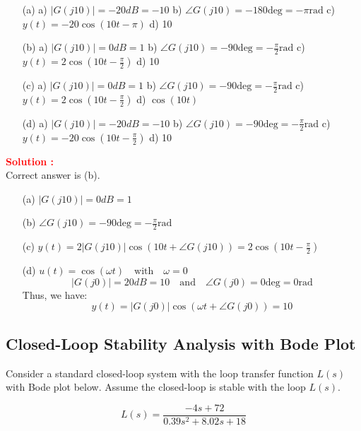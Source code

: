 \documentclass[12pt]{article}
\begin{document}
\begin{itemize}
    \item[(a)] a) \(|G(j10)| = -20 dB = -10\) b) \(\angle G(j10) = -180 \text{deg} = -\pi \text{rad}\) c) \(y(t) = -20 \cos(10t-\pi) \) d) 10
    \item[(b)] a) \(|G(j10)| = 0 dB = 1\) b) \(\angle G(j10) = -90 \text{deg} = -\frac{\pi}{2} \text{rad}\) c) \(y(t) = 2 \cos(10t-\frac{\pi}{2}) \) d) 10
    \item[(c)] a) \(|G(j10)| = 0 dB = 1\) b) \(\angle G(j10) = -90 \text{deg} = -\frac{\pi}{2} \text{rad}\) c) \(y(t) = 2 \cos(10t-\frac{\pi}{2}) \) d) \(\cos(10t)\) 
    \item[(d)] a) \(|G(j10)| = -20 dB = -10\) b) \(\angle G(j10) = -90 \text{deg} = -\frac{\pi}{2} \text{rad}\) c) \(y(t) = -20 \cos(10t-\frac{\pi}{2}) \) d) 10
\end{itemize}
\textbf{\textcolor{red}{Solution :}}\\
Correct answer is (b).\\
\begin{itemize}
    \item[(a)] \(|G(j10)| = 0 dB = 1\)
    \item[(b)] \(\angle G(j10) = -90 \text{deg} = -\frac{\pi}{2} \text{rad}\)
    \item[(c)] \(y(t) = 2|G(j10)|\cos(10t + \angle G(j10)) = 2 \cos(10t-\frac{\pi}{2}) \)
    \item[(d)] \(u(t) = \cos(\omega t) \quad \text{with} \quad \omega = 0\)
    \[|G(j0)| = 20 dB = 10 \quad \text{and} \quad \angle G(j0) = 0 \text{deg} = 0 \text{rad}\]
    Thus, we have:
    \[y(t) = |G(j0)| \cos(\omega t + \angle G(j0)) = 10 \]
\end{itemize}
\clearpage

\subsection{Closed-Loop Stability Analysis with Bode Plot}

Consider a standard closed-loop system with the loop transfer function $L(s)$ with Bode plot below.  Assume the closed-loop is stable with the loop $L(s)$.

\begin{equation}
    L(s) = \frac{-4s + 72}{0.39 s^2 + 8.02 s + 18}
\end{equation}
\end{document}
